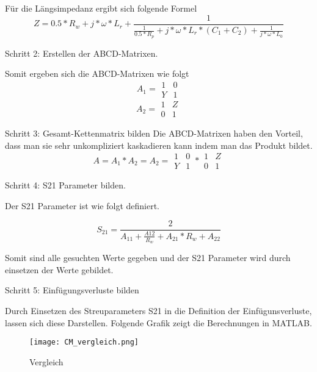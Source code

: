 Für die Längsimpedanz ergibt sich folgende Formel
\begin{equation}
Z = 0.5*R_w+j*\omega*L_r+\frac{ 1 }{ \frac{1}{0.5*R_p}+j*\omega*L_r*(C_1+C_2)+\frac{1}{j*\omega*L_0} }
\end{equation}


Schritt 2: Erstellen der ABCD-Matrixen.

Somit ergeben sich die ABCD-Matrixen wie folgt
\begin{equation}
A_1 =
\begin{matrix}
1 & 0\\ Y&1 
\end{matrix}
\end{equation}
\begin{equation}
A_2 =
\begin{matrix}
1 & Z\\ 0&1 
\end{matrix}
\end{equation}

Schritt 3: Gesamt-Kettenmatrix bilden
Die ABCD-Matrixen haben den Vorteil, dass man sie sehr unkompliziert kaskadieren kann indem man das Produkt bildet.
\begin{equation}
A = A_1*A_2 = A_2 = \begin{matrix}
1 & 0\\ Y&1 
\end{matrix} * 
\begin{matrix}
1 & Z\\ 0&1 
\end{matrix} 
\end{equation}

Schritt 4: S21 Parameter bilden.

Der S21 Parameter ist wie folgt definiert.

\begin{equation}
S_{21} = \frac{2}{A_{11}+\frac{A{12}}{R_w}+A_{21}*R_w+A_{22}}
\end{equation}

Somit sind alle gesuchten Werte gegeben und der S21 Parameter wird durch einsetzen der Werte gebildet.

Schritt 5: Einfügungsverluste bilden

Durch Einsetzen des Streuparameters S21 in die Definition der Einfügunsverluste, lassen sich diese Darstellen. Folgende Grafik zeigt die Berechnungen in MATLAB. 


\begin{figure}[H]
	\centering
	\texttt{[image: CM\_vergleich.png]}
	\caption{Vergleich}
	\label{fig:Vergleich Berechnung Simulation}
\end{figure}
